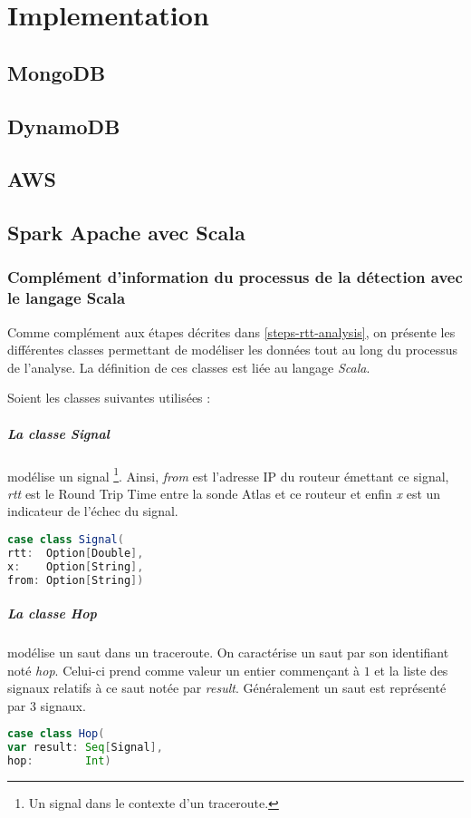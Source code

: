 \chapter{Implementation}

\section{MongoDB}

\section{DynamoDB}

\section{AWS}

\section{Spark Apache avec Scala}

\subsection{Complément d'information du processus de la détection avec le langage Scala}
Comme complément aux étapes décrites dans \ref{steps-rtt-analysis}, on présente les différentes classes permettant de modéliser les données tout au long du processus de l'analyse. La définition de ces classes est liée au langage \textit{Scala}. 

Soient les classes suivantes utilisées : 

\paragraph{La classe Signal} modélise un signal \footnote{Un signal dans le contexte d'un traceroute.}. Ainsi, \textit{from} est l'adresse IP du routeur émettant ce signal, \textit{rtt} est le Round Trip Time entre la sonde Atlas et ce routeur et enfin \textit{x} est un indicateur de l'échec du signal.
\begin{lstlisting}[language=scala]
case class Signal(
rtt:  Option[Double],
x:    Option[String],
from: Option[String])
\end{lstlisting}

\paragraph{La classe Hop} modélise un saut dans un traceroute. On caractérise un saut par son identifiant noté \textit{hop}. Celui-ci   prend comme valeur un entier commençant à $1$ et la liste des signaux relatifs à ce saut notée par \textit{result}. Généralement un saut est représenté par $3$ signaux.
\begin{lstlisting}[language=scala]
case class Hop(
var result: Seq[Signal],
hop:        Int)
\end{lstlisting}
